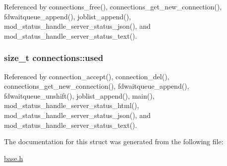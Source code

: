 Referenced by connections\-\_\-free(), connections\-\_\-get\-\_\-new\-\_\-connection(), fdwaitqueue\-\_\-append(), joblist\-\_\-append(), mod\-\_\-status\-\_\-handle\-\_\-server\-\_\-status\-\_\-json(), and mod\-\_\-status\-\_\-handle\-\_\-server\-\_\-status\-\_\-text().

\hypertarget{structconnections_ab810ad1745091a72c889255e894b7037}{
\subsubsection[{used}]{\setlength{\rightskip}{0pt plus 5cm}size\-\_\-t connections\-::used}}\label{structconnections_ab810ad1745091a72c889255e894b7037}


Referenced by connection\-\_\-accept(), connection\-\_\-del(), connections\-\_\-get\-\_\-new\-\_\-connection(), fdwaitqueue\-\_\-append(), fdwaitqueue\-\_\-unshift(), joblist\-\_\-append(), main(), mod\-\_\-status\-\_\-handle\-\_\-server\-\_\-status\-\_\-html(), mod\-\_\-status\-\_\-handle\-\_\-server\-\_\-status\-\_\-json(), and mod\-\_\-status\-\_\-handle\-\_\-server\-\_\-status\-\_\-text().



The documentation for this struct was generated from the following file\-:\begin{DoxyCompactItemize}
\item 
\hyperlink{base_8h}{base.\-h}\end{DoxyCompactItemize}
